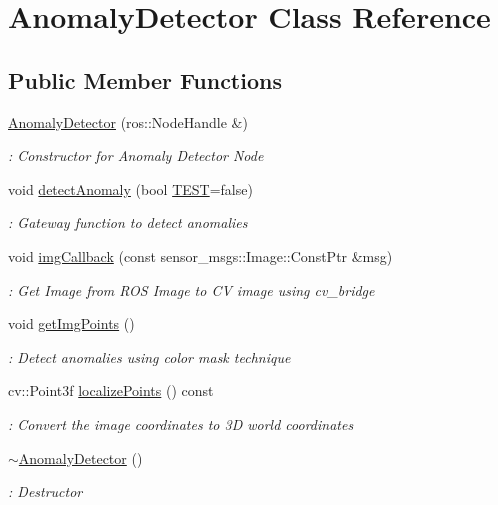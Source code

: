\hypertarget{class_anomaly_detector}{}\section{Anomaly\+Detector Class Reference}
\label{class_anomaly_detector}
\subsection*{Public Member Functions}
\begin{DoxyCompactItemize}
\item 
\hyperlink{class_anomaly_detector_af04ba43e876ab1c571da0a85e0091214}{Anomaly\+Detector} (ros\+::\+Node\+Handle \&)
\begin{DoxyCompactList}\small\item\em \+: Constructor for Anomaly Detector Node \end{DoxyCompactList}\item 
void \hyperlink{class_anomaly_detector_ac053d1b920d7cd4608bc3de291a7aeb0}{detect\+Anomaly} (bool \hyperlink{mover_test_8cpp_a623261ba51a174145109c15aadc6e5dd}{T\+E\+ST}=false)
\begin{DoxyCompactList}\small\item\em \+: Gateway function to detect anomalies \end{DoxyCompactList}\item 
void \hyperlink{class_anomaly_detector_a03f147d46834d55a0d1630d91afa1334}{img\+Callback} (const sensor\+\_\+msgs\+::\+Image\+::\+Const\+Ptr \&msg)
\begin{DoxyCompactList}\small\item\em \+: Get Image from R\+OS Image to CV image using cv\+\_\+bridge \end{DoxyCompactList}\item 
void \hyperlink{class_anomaly_detector_aaaa09563dc7e8f76609b9e9b9e901dce}{get\+Img\+Points} ()
\begin{DoxyCompactList}\small\item\em \+: Detect anomalies using color mask technique \end{DoxyCompactList}\item 
cv\+::\+Point3f \hyperlink{class_anomaly_detector_aa97b11cf22fdd64d5f38e4d49025bda1}{localize\+Points} () const
\begin{DoxyCompactList}\small\item\em \+: Convert the image coordinates to 3D world coordinates \end{DoxyCompactList}\item 
\hyperlink{class_anomaly_detector_a290e2e224cc13e72e733697b1635da9b}{$\sim$\+Anomaly\+Detector} ()
\begin{DoxyCompactList}\small\item\em \+: Destructor \end{DoxyCompactList}\end{DoxyCompactItemize}

